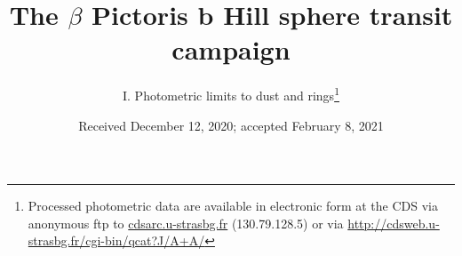 \documentclass[longauth]{aa} %
\begin{document}
\title{The $\beta$ Pictoris b Hill sphere transit campaign}
\subtitle{I. Photometric limits to dust and rings\thanks{Processed photometric data are available in electronic form at the CDS via anonymous ftp to \url{cdsarc.u-strasbg.fr} (130.79.128.5) or via \url{http://cdsweb.u-strasbg.fr/cgi-bin/qcat?J/A+A/}}}




\date{Received December 12, 2020; accepted February 8, 2021}
\end{document}

